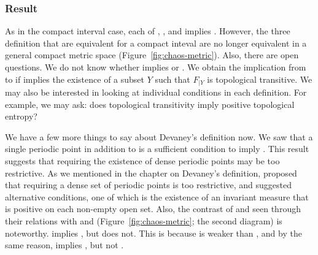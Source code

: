 \documentclass[12pt,twoside,draft]{book}
\begin{document}
\subsubsection*{Result}
As in the compact interval case, each of \dev, \blcp, and \pte implies \liy.
However, the three definition that are equivalent for a compact inteval are no longer equivalent in a general compact metric space (Figure~\ref{fig:chaos-metric}).
Also, there are open questions.
We do not know whether \pte implies \blcp or \dev.
We obtain the implication from \pte to \wig if \pte implies the existence of a subset $Y$ such that $F_{|Y}$ is topological transitive.
We may also be interested in looking at individual conditions in each definition.
For example, we may ask: does topological transitivity imply positive topological entropy?

We have a few more things to say about Devaney's definition now.
We saw that a single periodic point in addition to \wig is a sufficient condition to imply \liy. 
This result suggests that requiring the existence of dense periodic points may be too restrictive.
As we mentioned in the chapter on Devaney's definition, \citet{glasner} proposed that requiring a dense set of periodic points is too restrictive, and suggested alternative conditions, one of which is the existence of an invariant measure that is positive on each non-empty open set.
Also, the contrast of \dev and \wig seen through their relations with \pte and \liy (Figure~\ref{fig:chaos-metric}; the second diagram) is noteworthy.
\dev implies \liy, but \wig does not.
This is because \wig is weaker than \dev, and by the same reason, \blcp implies \wig, but not \dev.




\printindex
\end{document}
